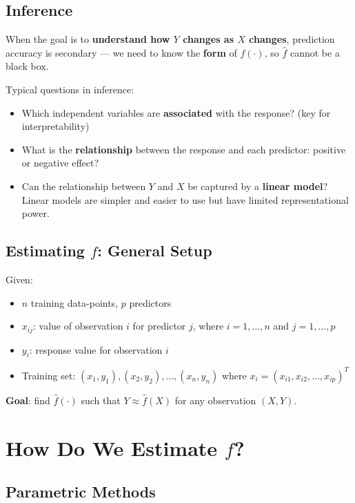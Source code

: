 \documentclass[11pt,a4paper]{article}
\theoremstyle{definition}
\theoremstyle{plain}
\theoremstyle{remark}
\begin{document}
\subsection{Inference}

When the goal is to \textbf{understand how $Y$ changes as $X$ changes}, prediction accuracy is secondary — we need to know the \textbf{form} of $f(\cdot)$, so $\hat{f}$ cannot be a black box.

Typical questions in inference:
\begin{itemize}
    \item Which independent variables are \textbf{associated} with the response? (key for interpretability)
    \item What is the \textbf{relationship} between the response and each predictor: positive or negative effect?
    \item Can the relationship between $Y$ and $X$ be captured by a \textbf{linear model}? Linear models are simpler and easier to use but have limited representational power.
\end{itemize}

\subsection{Estimating \texorpdfstring{$f$}{f}: General Setup}

Given:
\begin{itemize}
    \item $n$ training data-points, $p$ predictors
    \item $x_{ij}$: value of observation $i$ for predictor $j$, where $i = 1, \ldots, n$ and $j = 1, \ldots, p$
    \item $y_i$: response value for observation $i$
    \item Training set: $(x_1, y_1), (x_2, y_2), \ldots, (x_n, y_n)$ where $x_i = (x_{i1}, x_{i2}, \ldots, x_{ip})^T$
\end{itemize}

\textbf{Goal}: find $\hat{f}(\cdot)$ such that $Y \approx \hat{f}(X)$ for any observation $(X, Y)$.


\section{How Do We Estimate \texorpdfstring{$f$}{f}?}

\subsection{Parametric Methods}
\end{document}
